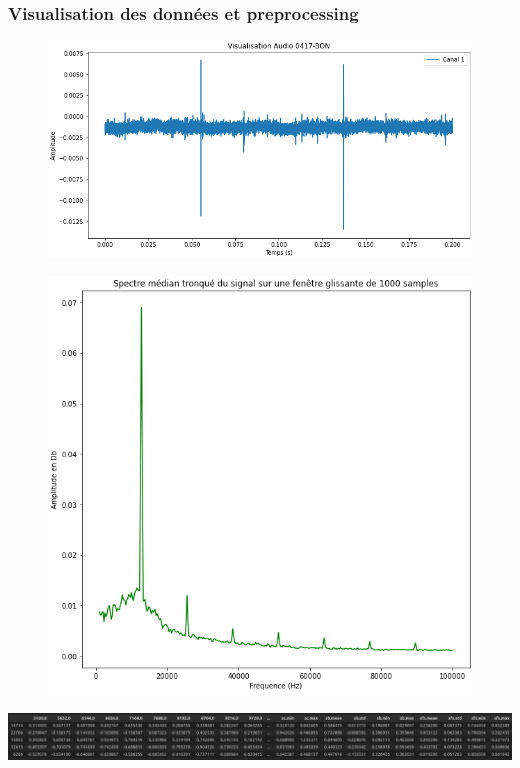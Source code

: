 \documentclass{beamer}
\theoremstyle{definition}
\begin{document}
\begin{frame}
	\frametitle{Visualisation des données et preprocessing}
	\begin{minipage}[t]{1\linewidth}
		\begin{minipage}[c]{0.51\linewidth}\centering\begin{figure}
				\centering
				\includegraphics[width=1\linewidth]{14.png}\\[0.25cm]
				
		\end{figure}\end{minipage}\hfill 
		\begin{minipage}[c]{0.45\linewidth}\centering\begin{figure}
				\begin{center}
					\centering
					\includegraphics[width=0.8\linewidth]{13.png}
				\end{center}
		\end{figure}\end{minipage}
	\end{minipage}
\begin{center}
	\centering
	\includegraphics[width=1\linewidth]{data.png}
\end{center}	
\end{frame}
\end{document}
